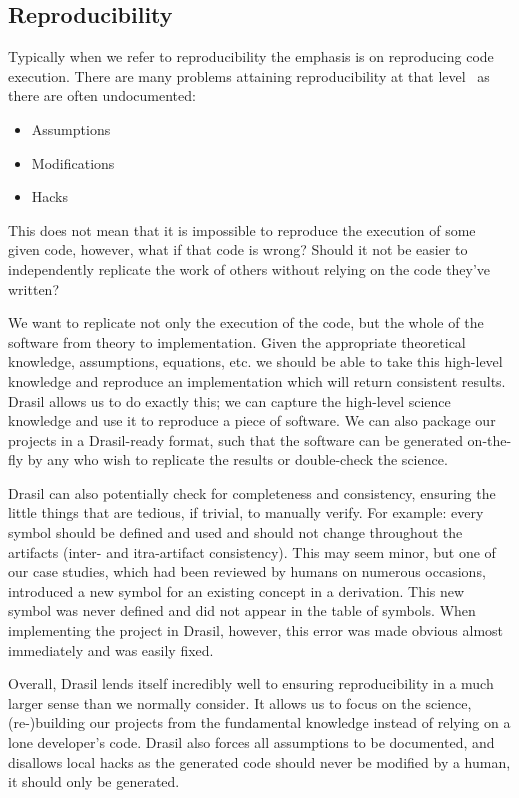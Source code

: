 \documentclass[sigconf]{acmart}
\begin{document}
{\subsection{Reproducibility}

Typically when we refer to reproducibility the emphasis is on reproducing code 
execution. There are many problems attaining reproducibility at that 
level~\cite{IonescuAndJansson2013} as there are often undocumented:

\begin{itemize}
\item Assumptions
\item Modifications
\item Hacks
\end{itemize}

This does not mean that it is impossible to reproduce the execution of some 
given code, however, what if that code is wrong? Should it not be easier to 
independently replicate the work of others without relying on the code they've 
written?

We want to replicate not only the execution of the code, but the whole of the 
software from theory to implementation. Given the appropriate theoretical 
knowledge, assumptions, equations, etc. we should be able to take this 
high-level knowledge and reproduce an implementation which will return 
consistent results. Drasil allows us to do exactly this; we can capture the 
high-level science knowledge and use it to reproduce a piece of software. We 
can also package our projects in a Drasil-ready format, such that the software 
can be generated on-the-fly by any who wish to replicate the results or 
double-check the science.

Drasil can also potentially check for completeness and consistency, ensuring 
the little things that are tedious, if trivial, to manually verify. For 
example: every symbol should be defined and used and should not change 
throughout the artifacts (inter- and itra-artifact consistency). This may seem 
minor, but one of our case studies, which had been reviewed by humans on 
numerous occasions, introduced a new symbol for an existing concept in a 
derivation. This new symbol was never defined and did not appear in the table of 
symbols. When implementing the project in Drasil, however, this error was made 
obvious almost immediately and was easily fixed.

Overall, Drasil lends itself incredibly well to ensuring reproducibility in a 
much larger sense than we normally consider. It allows us to focus on the 
science, (re-)building our projects from the fundamental knowledge instead of 
relying on a lone developer's code. Drasil also forces all assumptions to be 
documented, and disallows local hacks as the generated code should never be 
modified by a human, it should only be generated.

}
\end{document}
